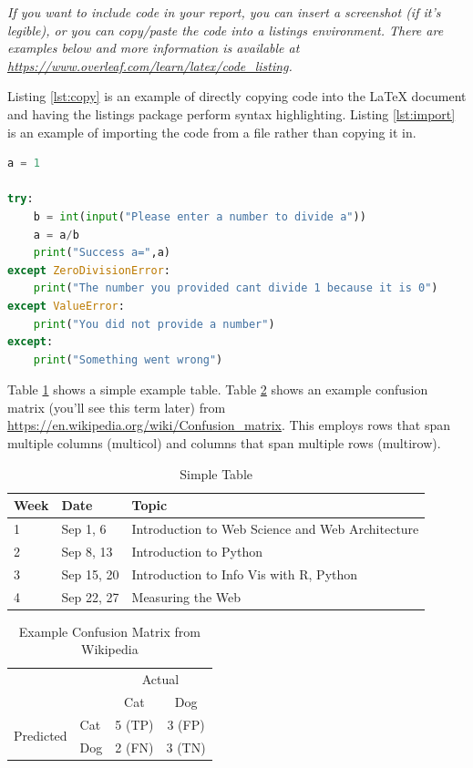 \documentclass[12pt]{article}
\begin{document}
\emph{If you want to include code in your report, you can insert a screenshot (if it's legible), or you can copy/paste the code into a listings environment. There are examples below and more information is available at \url{https://www.overleaf.com/learn/latex/code_listing}.}

Listing \ref{lst:copy} is an example of directly copying code into the LaTeX document and having the listings package perform syntax highlighting. Listing \ref{lst:import} is an example of importing the code from a file rather than copying it in.

\begin{lstlisting}[language=Python, caption=Python example copied into the LaTeX, label=lst:copy]
a = 1

try:
    b = int(input("Please enter a number to divide a"))
    a = a/b
    print("Success a=",a)
except ZeroDivisionError:
    print("The number you provided cant divide 1 because it is 0")
except ValueError:
    print("You did not provide a number")
except:
    print("Something went wrong")
\end{lstlisting}



Table \ref{tbl:simple} shows a simple example table.  Table \ref{tbl:confusion} shows an example confusion matrix (you'll see this term later) from \url{https://en.wikipedia.org/wiki/Confusion_matrix}. This employs rows that span multiple columns (multicol) and columns that span multiple rows (multirow). 

\begin{table}[h]
\centering
\caption{Simple Table}
\label{tbl:simple}
\begin{tabular}{|l|l|l|}
\hline
\textbf{Week} & \textbf{Date} & \textbf{Topic} \\ \hline \hline
1 & Sep 1, 6 & Introduction to Web Science and Web Architecture \\ \hline
2 & Sep 8, 13 & Introduction to Python \\ \hline
3 & Sep 15, 20 & Introduction to Info Vis with R, Python \\ \hline
4 & Sep 22, 27 & Measuring the Web \\ \hline
\end{tabular}
\end{table}

\begin{table}[h]
\centering
\caption{Example Confusion Matrix from Wikipedia}
\label{tbl:confusion}
\begin{tabular}{l|l|c|c|}
\multicolumn{2}{c}{}&\multicolumn{2}{c}{Actual}\\
\cline{3-4}
\multicolumn{2}{c|}{}&Cat&Dog\\
\cline{2-4}
\multirow{2}{*}{Predicted}& Cat & 5 (TP) & 3 (FP)\\
\cline{2-4}
& Dog & 2 (FN) & 3 (TN) \\
\cline{2-4}
\end{tabular}
\end{table}
\end{document}
